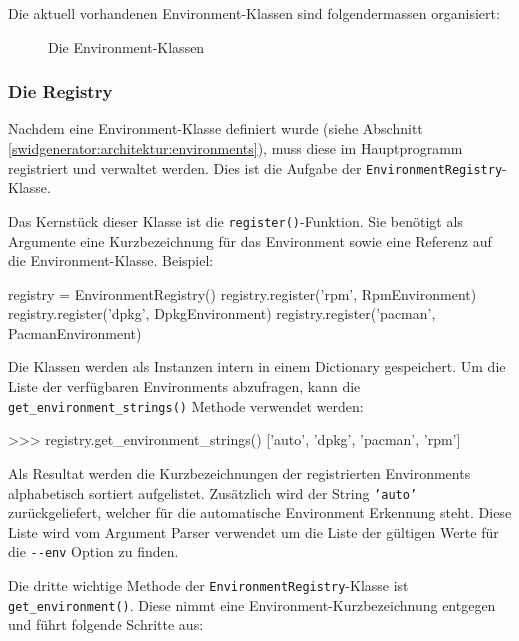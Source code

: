 Die aktuell vorhandenen Environment-Klassen sind folgendermassen organisiert:

\begin{figure}[H]
	\centering
	\resizebox{\textwidth}{!}{%
		
	}
	\caption{Die Environment-Klassen}
	\label{img:environment-klassendiagramm}
\end{figure}


\subsubsection{Die Registry}
\label{swidgenerator:architektur:environments:registry}

Nachdem eine Environment-Klasse definiert wurde (siehe Abschnitt
\ref{swidgenerator:architektur:environments}), muss diese im Hauptprogramm
registriert und verwaltet werden. Dies ist die Aufgabe der
\texttt{EnvironmentRegistry}-Klasse.

Das Kernstück dieser Klasse ist die \texttt{register()}-Funktion. Sie benötigt als
Argumente eine Kurzbezeichnung für das Environment sowie eine Referenz auf die
Environment-Klasse. Beispiel:

\begin{pythoncode}
registry = EnvironmentRegistry()
registry.register('rpm', RpmEnvironment)
registry.register('dpkg', DpkgEnvironment)
registry.register('pacman', PacmanEnvironment)
\end{pythoncode}

Die Klassen werden als Instanzen intern in einem Dictionary gespeichert. Um die
Liste der verfügbaren Environments abzufragen, kann die
\texttt{get\_environment\_strings()} Methode verwendet werden:

\begin{pythoncode}
>>> registry.get_environment_strings()
['auto', 'dpkg', 'pacman', 'rpm']
\end{pythoncode}

Als Resultat werden die Kurzbezeichnungen der registrierten Environments
alphabetisch sortiert aufgelistet. Zusätzlich wird der String \texttt{'auto'}
zurückgeliefert, welcher für die automatische Environment Erkennung steht. Diese
Liste wird vom Argument Parser verwendet um die Liste der gültigen Werte für die
\texttt{-{}-env} Option zu finden.

Die dritte wichtige Methode der \texttt{EnvironmentRegistry}-Klasse ist
\texttt{get\_environment()}. Diese nimmt eine Environment-Kurzbezeichnung
entgegen und führt folgende Schritte aus:

